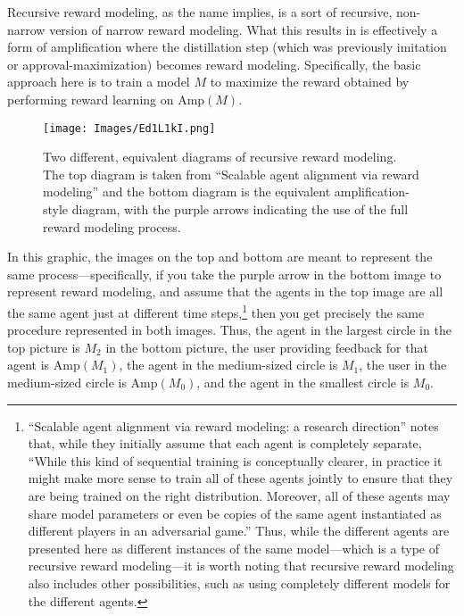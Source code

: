 \documentclass[
  onecolumn,
  natbib,
]{miri-tech-article}
\begin{document}
Recursive reward modeling, as the name implies, is a sort of recursive, non-narrow version of narrow reward modeling.\cite{leike} What this results in is effectively a form of amplification where the distillation step (which was previously imitation or approval-maximization) becomes reward modeling. Specifically, the basic approach here is to train a model $M$ to maximize the reward obtained by performing reward learning on $\text{Amp}(M)$.

\vspace{4mm}

\begin{figure}[H]
  \centering
  \texttt{[image: Images/Ed1L1kI.png]}
  \caption{Two different, equivalent diagrams of recursive reward modeling. The top diagram is taken from ``Scalable agent alignment via reward modeling'' and the bottom diagram is the equivalent amplification-style diagram, with the purple arrows indicating the use of the full reward modeling process.}
\end{figure}

\vspace{2mm}

\noindent In this graphic, the images on the top and bottom are meant to represent the same process---specifically, if you take the purple arrow in the bottom image to represent reward modeling, and assume that the agents in the top image are all the same agent just at different time steps,\footnote{``Scalable agent alignment via reward modeling: a research direction''\cite{leike} notes that, while they initially assume that each agent is completely separate, ``While this kind of sequential training is conceptually clearer, in practice it might make more sense to train all of these agents jointly to ensure that they are being trained on the right distribution. Moreover, all of these agents may share model parameters or even be copies of the same agent instantiated as different players in an adversarial game.'' Thus, while the different agents are presented here as different instances of the same model---which is a type of recursive reward modeling---it is worth noting that recursive reward modeling also includes other possibilities, such as using completely different models for the different agents.} then you get precisely the same procedure represented in both images. Thus, the agent in the largest circle in the top picture is $M_2$ in the bottom picture, the user providing feedback for that agent is $\text{Amp}(M_1)$, the agent in the medium-sized circle is $M_1$, the user in the medium-sized circle is $\text{Amp}(M_0)$, and the agent in the smallest circle is $M_0$.
\end{document}
